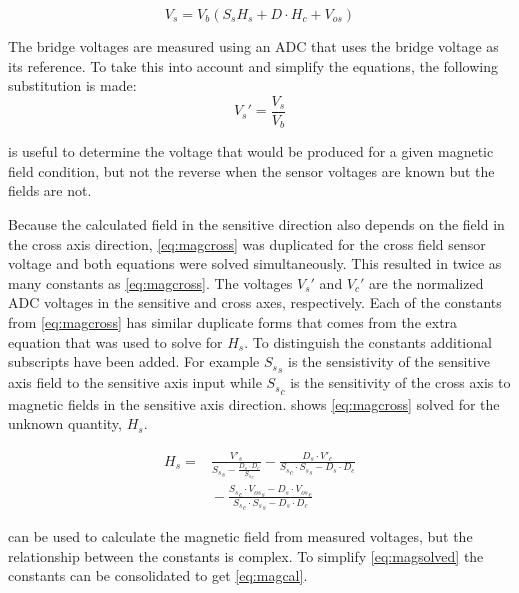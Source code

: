 \begin{equation}
    V_s = V_b \left(S_s H_s + D \cdot H_c + V_{os} \right)
    \label{eq:magcross}
\end{equation}
 
The bridge voltages are measured using an \ac{ADC} that uses the bridge voltage as its reference. To take this into account and simplify the equations, the following substitution is made:
\begin{equation}
    V_s'=\frac{V_s}{V_b}
    \label{eq:adcsub}
\end{equation}

 is useful to determine the voltage that would be produced for a given magnetic field condition, but not the reverse when the sensor voltages are known but the fields are not.

Because the calculated field in the sensitive direction also depends on the field in the cross axis direction, \cref{eq:magcross} was duplicated for the cross field sensor voltage and both equations were solved simultaneously. This resulted in twice as many constants as \cref{eq:magcross}. The voltages $V_s'$ and $V_c'$ are the normalized \ac{ADC} voltages in the sensitive and cross axes, respectively. Each of the constants from \cref{eq:magcross} has similar duplicate forms that comes from the extra equation that was used to solve for $H_s$. To distinguish the constants additional subscripts have been added. For example ${S_s}_s$ is the sensistivity of the sensitive axis field to the sensitive axis input while ${S_s}_c$ is the sensitivity of the cross axis to magnetic fields in the sensitive axis direction.  shows \cref{eq:magcross} solved for the unknown quantity, $H_s$.

\begin{equation}
    \begin{split}
    H_s = & \frac{V'_s }{{S_s}_s - \frac{D_s \cdot D_c}{{S_s}_c}} - \frac{D_s \cdot  V'_c }{{S_s}_c \cdot {S_s}_s - D_s \cdot D_c}\\
    & {}- \frac{{S_s}_c \cdot {V_{os}}_s  -D_s \cdot {V_{os}}_c}{{S_s}_c \cdot {S_s}_s - D_s \cdot D_c}
    \end{split}
    \label{eq:magsolved} 
\end{equation}

 can be used to calculate the magnetic field from measured voltages, but the relationship between the constants is complex. To simplify \cref{eq:magsolved} the constants can be consolidated to get \cref{eq:magcal}.


